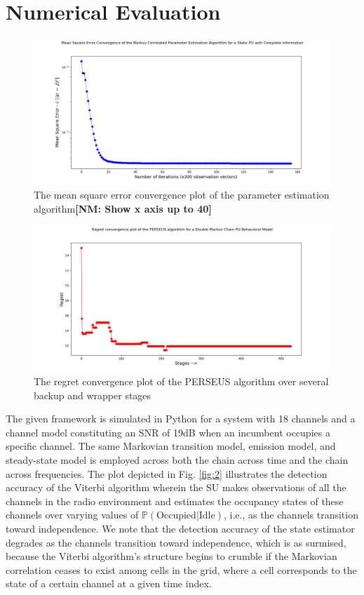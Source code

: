 \documentclass[10pt,twocolumn]{IEEEtran}
\newcommand{\nm}[1]{{\color{blue}\bf{[NM: #1]}}}
\begin{document}
\section{Numerical Evaluation}\label{IV}
\begin{figure}
    \centering
    \includegraphics[scale=0.25]{Mean_Square_Plot_Log_Scale.png}
    \caption{The mean square error convergence plot of the parameter estimation algorithm\nm{Show x axis up to 40}}
    \label{fig:5}
\end{figure}
\begin{figure}
    \centering
    \includegraphics[scale=0.25]{Regret_Convergence_Plot_04112019.png}
    \caption{The regret convergence plot of the PERSEUS algorithm over several backup and wrapper stages}
    \label{fig:6}
\end{figure}
The given framework is simulated in Python for a system with 18 channels and a channel model constituting an SNR of 19dB when an incumbent occupies a specific channel. The same Markovian transition model, emission model, and steady-state model is employed across both the chain across time and the chain across frequencies. The plot depicted in Fig. \ref{fig:2} illustrates the detection accuracy of the Viterbi algorithm wherein the SU makes observations of all the channels in the radio environment and estimates the occupancy states of these channels over varying values of $\mathbb{P}(\text{Occupied}|\text{Idle})$, i.e., as the channels transition toward independence. We note that the detection accuracy of the state estimator degrades as the channels transition toward independence, which is as surmised, because the Viterbi algorithm's structure begins to crumble if the Markovian correlation ceases to exist among cells in the grid, where a cell corresponds to the state of a certain channel at a given time index.
\end{document}
